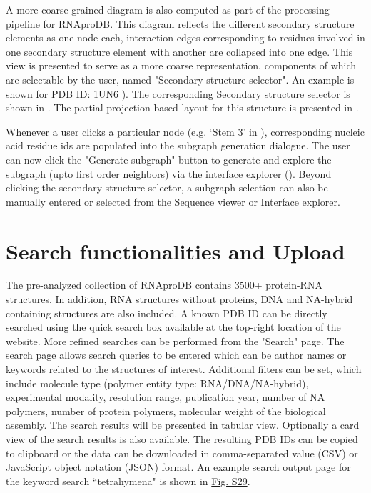 A more coarse grained diagram is also computed as part of the processing pipeline for RNAproDB. This diagram reflects the different secondary structure elements as one node each, interaction edges corresponding to residues involved in one secondary structure element with another are collapsed into one edge. This view is presented to serve as a more coarse representation, components of which are selectable by the user, named "Secondary structure selector". An example is shown for PDB ID: 1UN6 ). The corresponding Secondary structure selector is shown in . The partial projection-based layout for this structure is presented in . 

Whenever a user clicks a particular node (e.g. `Stem 3' in ), corresponding nucleic acid residue ids are populated into the subgraph generation dialogue. The user can now click the "Generate subgraph" button to generate and explore the subgraph (upto first order neighbors) via the interface explorer (). Beyond clicking the secondary structure selector, a subgraph selection can also be manually entered or selected from the Sequence viewer or Interface explorer. 

\section{Search functionalities and Upload}

The pre-analyzed collection of RNAproDB contains 3500+ protein-RNA structures. In addition, RNA structures without proteins, DNA and NA-hybrid containing structures are also included. A known PDB ID can be directly searched using the quick search box available at the top-right location of the website. More refined searches can be performed from the "Search" page. The search page allows search queries to be entered which can be author names or keywords related to the structures of interest. Additional filters can be set, which include molecule type (polymer entity type: RNA/DNA/NA-hybrid), experimental modality, resolution range, publication year, number of NA polymers, number of protein polymers, molecular weight of the biological assembly. The search results will be presented in tabular view. Optionally a card view of the search results is also available. The resulting PDB IDs can be copied to clipboard or the data can be downloaded in comma-separated value (CSV) or JavaScript object notation (JSON) format. An example search output page for the keyword search ``tetrahymena" is shown in \hyperref[fig:rnaprodbS1]{Fig. S29}.

